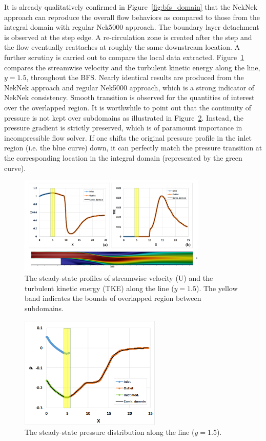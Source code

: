 It is already qualitatively confirmed in Figure~\ref{fig:bfs_domain} that the NekNek approach can reproduce the overall flow behaviors as compared to those from the integral domain with regular Nek5000 approach. The boundary layer detachment is observed at the step edge. 
A re-circulation zone is created after the step and the flow eventually reattaches at roughly the same downstream location. A further scrutiny is carried out to compare the local data extracted. Figure~\ref{fig:bfs_results} compares the streamwise velocity and the turbulent kinetic energy along the line, $y=1.5$, throughout the BFS. 
Nearly identical results are produced from the NekNek approach and regular Nek5000 approach, which is a strong indicator of NekNek consistency. Smooth transition is observed for the quantities of interest over the overlapped region. 
It is worthwhile to point out that the continuity of pressure is not kept over subdomains as illustrated in Figure~\ref{fig:bfs_pressure}. Instead, the pressure gradient is strictly preserved, which is of paramount importance in incompressible flow solver. If one shifts the original pressure profile in the inlet region (i.e. the blue curve) down, it can perfectly match the pressure transition at the corresponding location in the integral domain (represented by the green curve). 

\begin{figure}[!ht]
\centering
\includegraphics[width=0.8\textwidth]{./figures/bfs_neknek_results.png}
\caption{The steady-state profiles of streamwise velocity (U) and the turbulent kinetic energy (TKE) along the line ($y=1.5$). The yellow band indicates the bounds of overlapped region between subdomains. }
\label{fig:bfs_results}
\end{figure}

\begin{figure}[!ht]
\centering
\includegraphics[width=0.6\textwidth]{./figures/bfs_neknek_pressure.png}
\caption{The steady-state pressure distribution along the line ($y=1.5$). }
\label{fig:bfs_pressure}
\end{figure}

